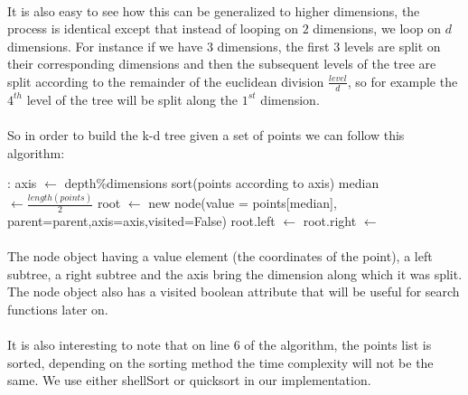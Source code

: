\documentclass[11 pt]{article}
\begin{document}
\paragraph{}It is also easy to see how this can be generalized to higher dimensions, the process is identical except that instead of looping on $2$ dimensions, we loop on $d$ dimensions. For instance if we have $3$ dimensions, the first $3$ levels are split on their corresponding dimensions and then the subsequent levels of the tree are split according to the remainder of the euclidean division $\frac{level}{d}$, so for example the $4^{th}$ level of the tree will be split along the $1^{st}$ dimension.
\paragraph{}So in order to build the k-d tree given a set of points we can follow this algorithm:
\begin{center}
\begin{algorithm}[H]

  :{
  \BlankLine
  \BlankLine
  \BlankLine
  \BlankLine
  axis $\leftarrow$ depth\%dimensions\;
  sort(points according to axis)\;
  median $\leftarrow \frac{length(points)}{2}$\;
  \BlankLine
  \BlankLine
  root $\leftarrow$ new node(value = points[median], parent=parent,axis=axis,visited=False)\;
  root.left $\leftarrow$ \;
  root.right $\leftarrow$ \;
  \BlankLine
  \BlankLine
  \;
}
\end{algorithm}
\end{center}
\paragraph{}The node object having a value element (the coordinates of the point), a left subtree, a right subtree and the axis bring the dimension along which it was split. The node object also has a visited boolean attribute that will be useful for search functions later on.
\paragraph{}It is also interesting to note that on line $6$ of the algorithm, the points list is sorted, depending on the sorting method the time complexity will not be the same. We use either shellSort or quicksort in our implementation.
\end{document}
